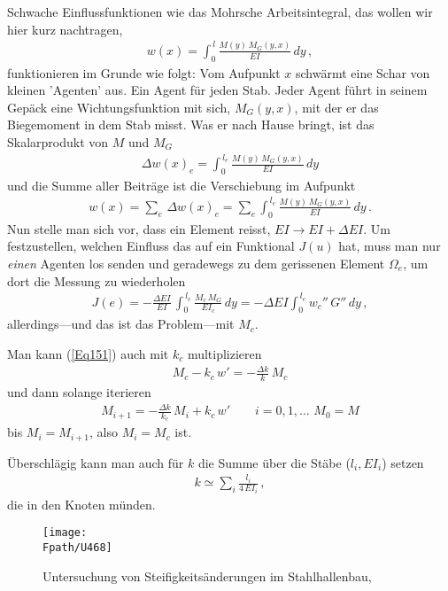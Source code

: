 {{{{{Schwache Einflussfunktionen wie das Mohrsche Arbeitsintegral, das wollen wir hier kurz nachtragen,
\begin{align}
w(x) = \int_0^{\,l} \frac{M(y)\,M_G(y,x)}{EI}\, dy\,,
\end{align}
funktionieren im Grunde wie folgt: Vom Aufpunkt $x$ schw\"{a}rmt eine Schar von kleinen 'Agenten' aus. Ein Agent f\"{u}r jeden Stab. Jeder Agent f\"{u}hrt in seinem Gep\"{a}ck eine Wichtungsfunktion mit sich, $M_G(y,x)$, mit der er das Biegemoment in dem Stab misst. Was er nach Hause bringt, ist das Skalarprodukt von $M$ und $M_G$
\begin{align}
\Delta w(x)_e = \int_0^{\,l_e} \frac{M(y)\,M_G(y,x)}{EI}\, dy
\end{align}
und die Summe aller Beitr\"{a}ge ist die Verschiebung im Aufpunkt
\begin{align}
w(x) = \sum_e\,\Delta w(x)_e = \sum_e  \int_0^{\,l_e} \frac{M(y)\,M_G(y,x)}{EI}\, dy\,.
\end{align}
Nun stelle man sich vor, dass ein Element reisst, $EI \to EI + \Delta EI$. Um festzustellen, welchen Einfluss das auf ein Funktional $J(u)$ hat, muss man nur {\em einen\/} Agenten los senden und geradewegs zu dem gerissenen Element $\Omega_e$, um dort die Messung zu wiederholen
\begin{align}
J(e) = -\frac{\Delta EI}{EI}\,\int_0^{\,l_e} \frac{M_c\,M_G}{EI_c}\,dy =- \Delta EI \int_0^{\,l_e} w_c''\,G''\,dy \,,
\end{align}
allerdings---und das ist das Problem---mit $M_c$.



Man kann (\ref{Eq151}) auch mit $k_c$ multiplizieren
\begin{align}
M_c - k_c\,w' = -\frac{\Delta k}{k} \,M_c
\end{align}
und dann solange iterieren
\begin{align}
M_{i+1} = -\frac{\Delta k}{k_c}\,M_i + k_c\,w'  \qquad i = 0, 1, \ldots\,\,M_0 = M
\end{align}
bis $M_i = M_{i+1}$, also $M_i = M_c$ ist.


\"{U}berschl\"{a}gig kann man auch f\"{u}r $k$ die Summe \"{u}ber die St\"{a}be ($l_i, EI_i$) setzen
\begin{align}
k \simeq  \sum_i \frac{l_i}{4\,EI_i}\,,
\end{align}
die in den Knoten m\"{u}nden.
\begin{figure}[tbp]
\centering
\texttt{[image: \\Fpath/U468]}
\caption{Untersuchung von Steifigkeits\"{a}nderungen im Stahlhallenbau, \cite{Carl4}}
\label{U468}
\end{figure}%


}}}}}
